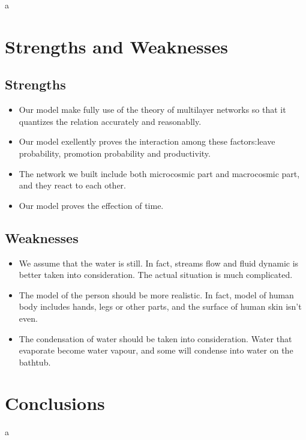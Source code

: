 \documentclass[12pt,a4paper,titlepage]{article}
\begin{document}
a

\section{Strengths and Weaknesses}
\label{sec:strengths-and-weaknesses}

\subsection*{Strengths}
\label{sec:strengths}

\begin{itemize}
\item Our model make fully use of the theory of multilayer networks so
  that it quantizes the relation accurately and reasonablly.
\item Our model exellently proves the interaction among these
  factors:leave probability, promotion probability and productivity.
\item The network we built include both microcosmic part and
  macrocosmic part, and they react to each other.
\item Our model proves the effection of time.
\end{itemize}

\subsection*{Weaknesses}
\label{sec:weaknesses}

\begin{itemize}
\item We assume that the water is still. In fact, streams flow and fluid dynamic is better taken into consideration. The actual situation is much complicated.
\item The model of the person should be more realistic. In fact, model of human body includes hands, legs or other parts, and the surface of human skin isn't even.
\item The condensation of water should be taken into consideration. Water that evaporate become water vapour, and some will condense into water on the bathtub.
\end{itemize}

\section{Conclusions}
\label{sec:conclusions}

a

\begin{thebibliography}{99}

\bibitem{}

\end{thebibliography}

\label{LastPage}
\end{document}
